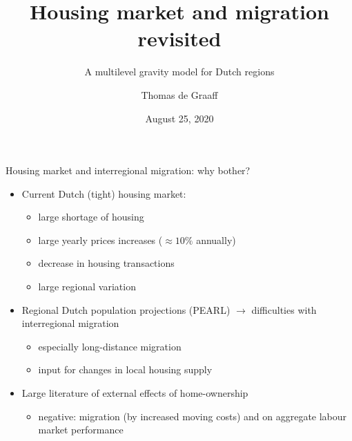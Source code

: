\documentclass{beamer}
\title{Housing market and migration revisited}
\subtitle{A multilevel gravity model for Dutch regions}
\date{August 25, 2020}
\author{Thomas de Graaff}
\institute{Vrije Universiteit Amsterdam\\Tinbergen Institute Amsterdam}
\begin{document}
\maketitle


\begin{frame}{Housing market and interregional migration: why bother?}
   	\begin{itemize}
   		\item Current Dutch (tight) housing market:
   		\begin{itemize}
   			\item large \alert{shortage} of housing
   			\item large yearly prices \alert{increases} ($\approx 10\%$ annually)
   			\item decrease in housing \alert{transactions}
   			\item large \alert{regional} variation\newline \pause
   		\end{itemize}
            \item Regional Dutch population projections (PEARL)  $\longrightarrow$ difficulties with \alert{interregional} migration
            \begin{itemize}
            \item especially long-distance migration  
            \item input for changes in local housing supply \newline \pause
            \end{itemize}
   		\item Large literature of \alert{external} effects of home-ownership \footnotesize{\citep{dietz2003social}}
   		\begin{itemize}
   			\item \alert{negative}: migration (by increased moving costs) and on aggregate labour market performance \footnotesize{\citep{oswald1996conjecture,oswald1999housing}}
   		\end{itemize}
   	\end{itemize}
\end{frame}
\end{document}
